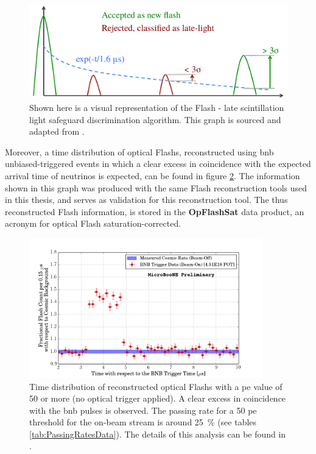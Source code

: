\begin{figure}[htbp]
    \centering
    \includegraphics[width=1.0\textwidth]{images/FirstCCInclusive/FlashReconstruction.pdf}
    \caption[Flash or Late Scintillation Light Discrimination]{Shown here is a visual representation of the \gls{Flash} - late scintillation light safeguard discrimination algorithm. This graph is sourced and adapted from \cite{MicroBooNEFlashRecoIT1}.}
    \label{fig:FlashReconstruction}
\end{figure}
Moreover, a time distribution of optical \glspl{Flash}, reconstructed using \gls{bnb} unbiased-triggered events in which a clear excess in coincidence with the expected arrival time of neutrinos is expected, can be found in figure \ref{fig:BNBFlashes}. The information shown in this graph was produced with the same \gls{Flash} reconstruction tools used in this thesis, and serves as validation for this reconstruction tool. The thus reconstructed \gls{Flash} information, is stored in the \textbf{OpFlashSat} data product, an acronym for optical \gls{Flash} saturation-corrected.
\begin{figure}[htbp]
    \centering
    \includegraphics[width=0.9\textwidth]{images/FirstCCInclusive/BNBFlashes.png}
    \caption[Time Distribution of Reconstructed Optical Flashes]{Time distribution of reconstructed optical \glspl{Flash} with a \gls{pe} value of \num{50} or more (no optical trigger applied). A clear excess in coincidence with the \gls{bnb} pulses is observed. The passing rate for a \num{50} \gls{pe} threshold for the on-beam stream is around \SI{25}{\percent} (see tables \ref{tab:PassingRatesData}). The details of this analysis can be found in \cite{MicroBooNEFirstNuPN}.}
    \label{fig:BNBFlashes}
\end{figure}


